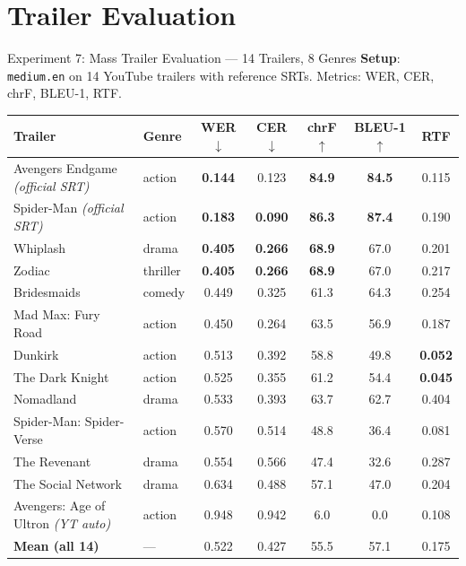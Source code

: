 \documentclass[aspectratio=169]{beamer}
\begin{document}
\section{Trailer Evaluation}
\begin{frame}{Experiment 7: Mass Trailer Evaluation — 14 Trailers, 8 Genres}
  \textbf{Setup}: \texttt{medium.en} on 14 YouTube trailers with reference SRTs. Metrics: WER, CER, chrF, BLEU-1, RTF.

  \vspace{0.1cm}
  \begin{center}
    \scriptsize
    \begin{tabular}{@{}llccccc@{}}
      \toprule
      \textbf{Trailer} & \textbf{Genre} & \textbf{WER} $\downarrow$ & \textbf{CER} $\downarrow$ & \textbf{chrF} $\uparrow$ & \textbf{BLEU-1} $\uparrow$ & \textbf{RTF} \\
      \midrule
      Avengers Endgame \textit{(official SRT)} & action & \textbf{0.144} & 0.123 & \textbf{84.9} & \textbf{84.5} & 0.115 \\
      Spider-Man \textit{(official SRT)} & action & \textbf{0.183} & \textbf{0.090} & \textbf{86.3} & \textbf{87.4} & 0.190 \\
      Whiplash & drama & \textbf{0.405} & \textbf{0.266} & \textbf{68.9} & 67.0 & 0.201 \\
      Zodiac & thriller & \textbf{0.405} & \textbf{0.266} & \textbf{68.9} & 67.0 & 0.217 \\
      Bridesmaids & comedy & 0.449 & 0.325 & 61.3 & 64.3 & 0.254 \\
      Mad Max: Fury Road & action & 0.450 & 0.264 & 63.5 & 56.9 & 0.187 \\
      Dunkirk & action & 0.513 & 0.392 & 58.8 & 49.8 & \textbf{0.052} \\
      The Dark Knight & action & 0.525 & 0.355 & 61.2 & 54.4 & \textbf{0.045} \\
      Nomadland & drama & 0.533 & 0.393 & 63.7 & 62.7 & 0.404 \\
      Spider-Man: Spider-Verse & action & 0.570 & 0.514 & 48.8 & 36.4 & 0.081 \\
      The Revenant & drama & 0.554 & 0.566 & 47.4 & 32.6 & 0.287 \\
      The Social Network & drama & 0.634 & 0.488 & 57.1 & 47.0 & 0.204 \\
      Avengers: Age of Ultron \textit{(YT auto)} & action & 0.948 & 0.942 & 6.0 & 0.0 & 0.108 \\
      \midrule
      \textbf{Mean (all 14)} & — & 0.522 & 0.427 & 55.5 & 57.1 & 0.175 \\
      \bottomrule
    \end{tabular}
  \end{center}


\end{frame}
\end{document}
